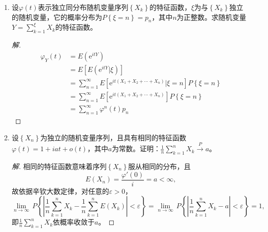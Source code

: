 \documentclass[12pt]{article}
\newcommand{\hei}{\CJKfamily{hei}}                          %
\begin{document}
\begin{enumerate}
\item {\hei 设$ \varphi(t) $表示独立同分布随机变量序列$ \left\{ {{X}_{k}} \right\} $的特征函数，$ {\xi}  $为与$ \left\{ {{X}_{k}} \right\} $独立的随机变量，它的概率分布为$ P\left\{ \xi =n \right\}={{p}_{n}} $，其中$ n $为正整数。求随机变量$ Y=\sum\limits_{k=1}^{\xi }{{{X}_{k}}} $的特征函数。}
\begin{proof}[解]
	\begin{equation}
		\begin{aligned}
			{{\varphi }_{Y}}\left( t \right)&=E\left( {{\text{e}}^{itY}} \right) \\ 
			& =E\left[ E\left( {{\text{e}}^{itY}}\left| \xi  \right. \right) \right] \\ 
			& =\sum\limits_{n=1}^{\infty }{E\left[ {{\text{e}}^{it\left( {{X}_{1}}+{{X}_{2}}+\cdots +{{X}_{n}} \right)}}\left| \xi =n \right. \right]P\left\{ \xi =n \right\}} \\ 
			& =\sum\limits_{n=1}^{\infty }{E\left[ {{\text{e}}^{it\left( {{X}_{1}}+{{X}_{2}}+\cdots +{{X}_{n}} \right)}} \right]P\left\{ \xi =n \right\}} \\ 
			& =\sum\limits_{n=1}^{\infty }{{{\varphi }^{n}}\left( t \right){{p}_{n}}}
		\end{aligned}
	\end{equation}
\end{proof}


\item {\hei 设$ \left\{ {{X}_{n}} \right\} $为独立的随机变量序列，且具有相同的特征函数$ \varphi \left( t \right)=1+iat+o\left( t \right) $，其中$ a $为常数。证明：$ \displaystyle{\frac{1}{n}}\sum\limits_{k=1}^{n}{{{X}_{k}}}\stackrel{P}{\longrightarrow} a $。}
\begin{proof}[解]
	相同的特征函数意味着序列$ \left\{ {{X}_{n}} \right\} $服从相同的分布，且
	\begin{equation}
		E\left( {{X}_{n}} \right)=\frac{{\varphi }'\left( 0 \right)}{i}=a<\infty,
	\end{equation}
	故依据辛钦大数定律，对任意的$ \varepsilon>0 $，
	\begin{equation}
		\underset{n\to \infty }{\mathop{\lim }}\,P\left\{ \left| \frac{1}{n}\sum\limits_{k=1}^{n}{{{X}_{k}}}-\frac{1}{n}\sum\limits_{k=1}^{n}{E\left( {{X}_{k}} \right)} \right|<\varepsilon  \right\}=\underset{n\to \infty }{\mathop{\lim }}\,P\left\{ \left| \frac{1}{n}\sum\limits_{k=1}^{n}{{{X}_{k}}}-a \right|<\varepsilon  \right\}=1,
	\end{equation}
	即$ \displaystyle{\frac{1}{n}}\sum\limits_{k=1}^{n}{{{X}_{k}}} $依概率收敛于$ a $。
\end{proof}



\end{enumerate}
\end{document}
